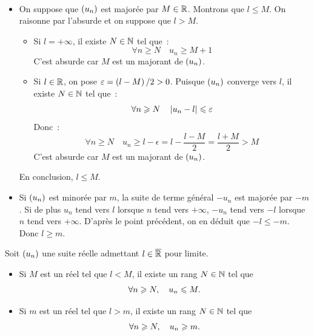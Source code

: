 \documentclass{magnoliaold}
\begin{document}
\begin{preuve}
$\quad$
\begin{itemize}
\item On suppose que $\left(u_n\right)$ est majorée par $M\in\mathbb{R}$. Montrons que
  $l\leq M$. On raisonne par l'absurde et on suppose que $l>M$.
  \begin{itemize}
  \item Si $l=+\infty$, il existe $N\in\mathbb{N}$ tel que~:
    \[\forall n\geq N \quad u_n \geq M+1\]
    C'est absurde car $M$ est un majorant de $\left(u_n\right)$.
  \item Si $l\in\mathbb{R}$, on pose $\varepsilon=\left(l-M\right)/2>0$. Puisque $\left(u_n\right)$ converge
    vers $l$, il existe $N\in\mathbb{N}$ tel que~:
    \[\forall n\geqslant N \quad \left|u_n-l\right|\leqslant \varepsilon\]
    Donc~:
    \[\forall n\geq N \quad u_n \geq l-\epsilon=l-\frac{l-M}{2}=
      \frac{l+M}{2}>M\]
    C'est absurde car $M$ est un majorant de $\left(u_n\right)$.
  \end{itemize}
  En conclusion, $l \leq M$.
\item Si $\left(u_n\right)$ est minorée par $m$, la suite de terme général $-u_n$ est
  majorée par $-m$. Si de plus $u_n$ tend vers $l$ lorsque $n$ tend vers
  $+\infty$, $-u_n$ tend vers $-l$ lorsque $n$ tend vers $+\infty$. D'après
  le point précédent, on en déduit que $-l \leq -m$. Donc $l \geq m$.
\end{itemize}
\end{preuve}


\begin{proposition}[utile=-3]
Soit $\left(u_n\right)$ une suite réelle admettant $l\in\overline{\mathbb{R}}$ pour limite.
\begin{itemize}
\item Si $M$ est un réel tel que $l<M$, il existe un rang $N\in\mathbb{N}$ tel que
  \[\forall n\geqslant N ,\quad u_n \leqslant M.\]
\item Si $m$ est un réel tel que $l>m$, il existe un rang $N\in\mathbb{N}$ tel que
  \[\forall n\geqslant N ,\quad u_n \geqslant m.\]
\end{itemize}
\end{proposition}
\end{document}
